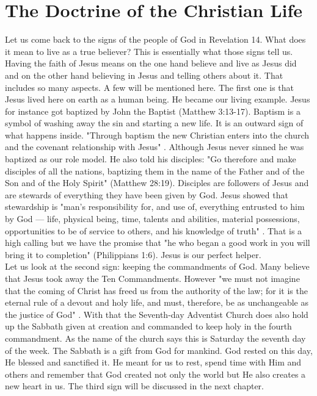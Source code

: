 \section{The Doctrine of the Christian Life}
Let us come back to the signs of the people of God in Revelation 14. What does it mean to live as a true believer? This is essentially what those signs tell us. Having the faith of Jesus means on the one hand believe and live as Jesus did and on the other hand believing in Jesus and telling others about it. That includes so many aspects. A few will be mentioned here. The first one is that Jesus lived here on earth as a human being. He became our living example. Jesus for instance got baptized by John the Baptist (Matthew 3:13-17). Baptism is a symbol of washing away the sin and starting a new life. It is an outward sign of what happens inside. "Through baptism the new Christian enters into the church and the covenant relationship with Jesus" \citep[p. 21]{Rice1986baptism}. Although Jesus never sinned he was baptized as our role model. He also told his disciples: "Go therefore and make disciples of all the nations, baptizing them in the name of the Father and of the Son and of the Holy Spirit" (Matthew 28:19). Disciples are followers of Jesus and are stewards of everything they have been given by God. Jesus showed that stewardship is "man's responsibility for, and use of, everything entrusted to him by God — life, physical being, time, talents and abilities, material possessions, opportunities to be of service to others, and his knowledge of truth" \citep[p. 1425]{neufeld1976seventh}. That is a high calling but we have the promise that "he who began a good work in you will bring it to completion" (Philippians 1:6). Jesus is our perfect helper.\\
Let us look at the second sign: keeping the commandments of God. Many believe that Jesus took away the Ten Commandments. However "we must not imagine that the coming of Christ has freed us from the authority of the law; for it is the eternal rule of a devout and holy life, and must, therefore, be as unchangeable as the justice of God" \citep[p. 277]{calvin1949john}. With that the Seventh-day Adventist Church does also hold up the Sabbath given at creation and commanded to keep holy in the fourth commandment. As the name of the church says this is Saturday the seventh day of the week. The Sabbath is a gift from God for mankind. God rested on this day, He blessed and sanctified it. He meant for us to rest, spend time with Him and others and remember that God created not only the world but He also creates a new heart in us. The third sign will be discussed in the next chapter.
